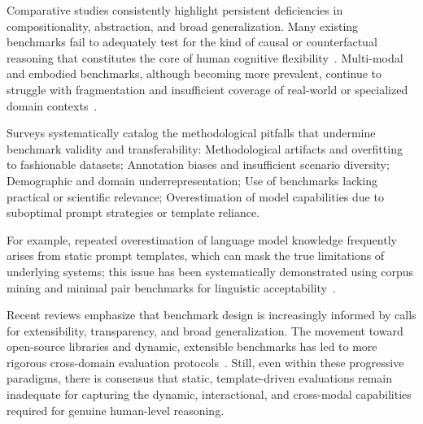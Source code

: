 \documentclass[sigconf]{acmart}
\begin{document}
Comparative studies consistently highlight persistent deficiencies in compositionality, abstraction, and broad generalization. Many existing benchmarks fail to adequately test for the kind of causal or counterfactual reasoning that constitutes the core of human cognitive flexibility~\cite{ref92, ref94, ref96, ref97, ref98, ref99}. Multi-modal and embodied benchmarks, although becoming more prevalent, continue to struggle with fragmentation and insufficient coverage of real-world or specialized domain contexts~\cite{ref92, ref94, ref95}.

Surveys systematically catalog the methodological pitfalls that undermine benchmark validity and transferability:
Methodological artifacts and overfitting to fashionable datasets;
Annotation biases and insufficient scenario diversity;
Demographic and domain underrepresentation;
Use of benchmarks lacking practical or scientific relevance;
Overestimation of model capabilities due to suboptimal prompt strategies or template reliance.

For example, repeated overestimation of language model knowledge frequently arises from static prompt templates, which can mask the true limitations of underlying systems; this issue has been systematically demonstrated using corpus mining and minimal pair benchmarks for linguistic acceptability~\cite{ref98, ref99}.

Recent reviews emphasize that benchmark design is increasingly informed by calls for extensibility, transparency, and broad generalization. The movement toward open-source libraries and dynamic, extensible benchmarks has led to more rigorous cross-domain evaluation protocols~\cite{ref5, ref15, ref20, ref23, ref31, ref36, ref37, ref55, ref61, ref62, ref63, ref64, ref74, ref75, ref80, ref86, ref87, ref89}. Still, even within these progressive paradigms, there is consensus that static, template-driven evaluations remain inadequate for capturing the dynamic, interactional, and cross-modal capabilities required for genuine human-level reasoning.
\end{document}
